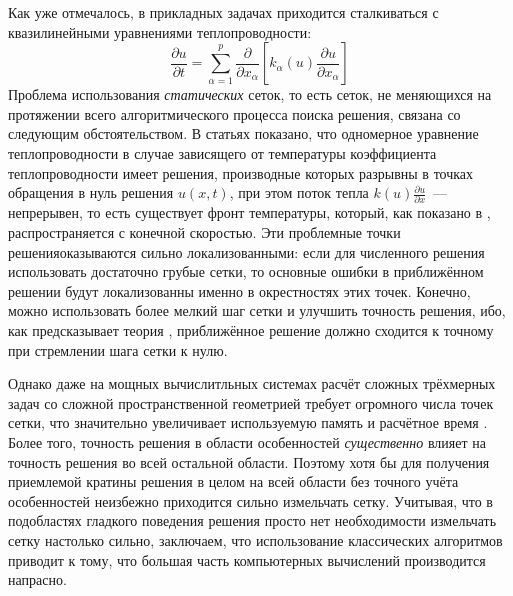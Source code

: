 Как уже отмечалось, в прикладных задачах приходится сталкиваться с квазилинейными уравнениями теплопроводности:
\begin{equation*}
    \frac{\partial u}{\partial t} =
    \sum\limits_{\alpha = 1}^{p} \frac{\partial }{\partial x_{\alpha}} \left[ 
        k_{\alpha}(u) \frac{\partial u}{\partial x_{\alpha}}
     \right]
\end{equation*}
Проблема использования \emph{статических} сеток, то есть сеток, не меняющихся на протяжении всего алгоритмического процесса поиска решения, связана со следующим обстоятельством.
В статьях \cite{ЗельдовичРазрывы, ЕщёРазрывы} показано, что одномерное уравнение теплопроводности в случае зависящего от температуры коэффициента теплопроводности имеет решения, производные которых разрывны в точках обращения в нуль решения $u(x, t)$, при этом поток тепла $k(u) \frac{\partial u}{\partial x}$~--- непрерывен, то есть существует фронт температуры, который, как показано в \cite{ЕщёЕщёРазрывы}, распространяется с конечной скоростью.
Эти \glqq проблемные точки решения\grqq оказываются сильно локализованными:
если для численного решения использовать достаточно грубые сетки, то основные ошибки в приближённом решении будут локализованны именно в окрестностях этих точек.
Конечно, можно использовать более мелкий шаг сетки и улучшить точность решения, ибо, как предсказывает теория \cite{СамарскийТеорияРазностныхСхем}, приближённое решение должно сходится к точному при стремлении шага сетки к нулю.

Однако даже на мощных вычислитльных системах расчёт сложных трёхмерных задач со сложной пространственной геометрией требует огромного числа точек сетки, что значительно увеличивает используемую память и расчётное время \cite{АфендиковЛАД}.
Более того, точность решения в области особенностей \emph{существенно} влияет на точность решения во всей остальной области.
Поэтому хотя бы для получения приемлемой кратины решения в целом на всей области без точного учёта особенностей неизбежно приходится сильно измельчать сетку.
Учитывая, что в подобластях гладкого поведения решения просто нет необходимости измельчать сетку настолько сильно, заключаем, что использование классических алгоритмов приводит к тому, что большая часть компьютерных вычислений производится напрасно.

